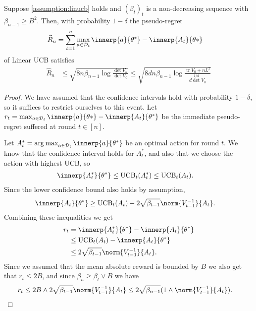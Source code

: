 \documentclass{article}
\newcommand{\inv}[1]{#1^{-1}}
\newcommand{\UCB}{\operatorname{UCB}}
\DeclareMathOperator*{\argmax}{arg\,max}
\DeclareMathOperator{\tr}{tr}
\newcommand{\Dset}[1]{\mathcal{D}_{#1}}
\begin{document}
\begin{theorem}\label{thm:linucb-regret}
  Suppose \cref{assumption:linucb} holds and $(\beta_t)_t$ is a
  non-decreasing sequence with $\beta_{n-1} \ge B^2$. Then, with
  probability $1-\delta$ the pseudo-regret
  \begin{align*}
    \widehat{R}_n &= \sum_{t=1}^n \max_{a\in\Dset{t}} \innerp{a}{\theta^*} - \innerp{A_t}{\theta*}
  \end{align*}
  of Linear UCB satisfies
  \begin{align*}
    \widehat{R}_n &\le \sqrt{8n\beta_{n-1} \log\frac{\det V_n}{\det V_0}}
                   \le \sqrt{8dn\beta_{n-1}\log\frac{\tr V_0 + nL^2}{d\det^{1/d} V_0}}
  \end{align*}

  \begin{proof}
    We have assumed that the confidence intervals hold with
    probability $1-\delta$, so it suffices to restrict ourselves to
    this event.  Let $r_t = \max_{a\in\Dset{t}} \innerp{a}{\theta*} -
    \innerp{A_t}{\theta^*}$ be the immediate pseudo-regret suffered at
    round $t\in[n]$.

    Let $A_t^* = \argmax_{a\in\Dset{t}}\innerp{a}{\theta^*}$ be an optimal
    action for round $t$.  We know that the confidence interval holds
    for $A_t^*$, and also that we choose the action with highest UCB, so
    \begin{align*}
      \innerp{A_t^*}{\theta^*} &\le \UCB_t(A_t^*) \le \UCB_t(A_t).
    \end{align*}
    Since the lower confidence bound also holds by assumption,
    \begin{align*}
      \innerp{A_t}{\theta^*} &\ge \UCB_t(A_t) - 2\sqrt{\beta_{t-1}}\norm{\inv{V_{t-1}}}{A_t}.
    \end{align*}
    Combining these inequalities we get
    \begin{align*}
      r_t &= \innerp{A_t^*}{\theta^*} - \innerp{A_t}{\theta^*} \\
         &\le \UCB_t(A_t) - \innerp{A_t}{\theta^*} \\
         &\le 2\sqrt{\beta_{t-1}}\norm{\inv{V_{t-1}}}{A_t}.
    \end{align*}
    Since we assumed that the mean absolute reward is bounded by $B$
    we also get that $r_t \le 2B$, and since $\beta_n \ge \beta_t \vee B$
    we have
    \begin{align*}
      r_t &\le 2B \wedge 2\sqrt{\beta_{t-1}}\norm{\inv{V_{t-1}}}{A_t}
           \le 2\sqrt{\beta_{n-1}} (1 \wedge \norm{\inv{V_{t-1}}}{A_t}).
    \end{align*}


\end{proof}
\end{theorem}
\end{document}
